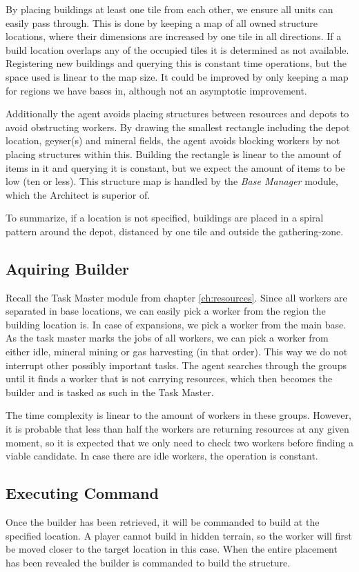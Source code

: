 	By placing buildings at least one tile from each other, we ensure all units can easily pass through. This is done by keeping a map of all owned structure locations, where their dimensions are increased by one tile in all directions. If a build location overlaps any of the occupied tiles it is determined as not available. Registering new buildings and querying this is constant time operations, but the space used is linear to the map size. It could be improved by only keeping a map for regions we have bases in, although not an asymptotic improvement.
	
	Additionally the agent avoids placing structures between resources and depots to avoid obstructing workers. By drawing the smallest rectangle including the depot location, geyser(s) and mineral fields, the agent avoids blocking workers by not placing structures within this. Building the rectangle is linear to the amount of items in it and querying it is constant, but we expect the amount of items to be low (ten or less). This structure map is handled by the \emph{Base Manager} module, which the Architect is superior of.
	
	To summarize, if a location is not specified, buildings are placed in a spiral pattern around the depot, distanced by one tile and outside the gathering-zone.

	\subsection*{Aquiring Builder}
	Recall the Task Master module from chapter \ref{ch:resources}. Since all workers are separated in base locations, we can easily pick a worker from the region the building location is. In case of expansions, we pick a worker from the main base. As the task master marks the jobs of all workers, we can pick a worker from either idle, mineral mining or gas harvesting (in that order). This way we do not interrupt other possibly important tasks. The agent searches through the groups until it finds a worker that is not carrying resources, which then becomes the builder and is tasked as such in the Task Master.
	
	The time complexity is linear to the amount of workers in these groups. However, it is probable that less than half the workers are returning resources at any given moment, so it is expected that we only need to check two workers before finding a viable candidate. In case there are idle workers, the operation is constant.
	
	\subsection*{Executing Command}
	Once the builder has been retrieved, it will be commanded to build at the specified location. A player cannot build in hidden terrain, so the worker will first be moved closer to the target location in this case. When the entire placement has been revealed the builder is commanded to build the structure.
	
